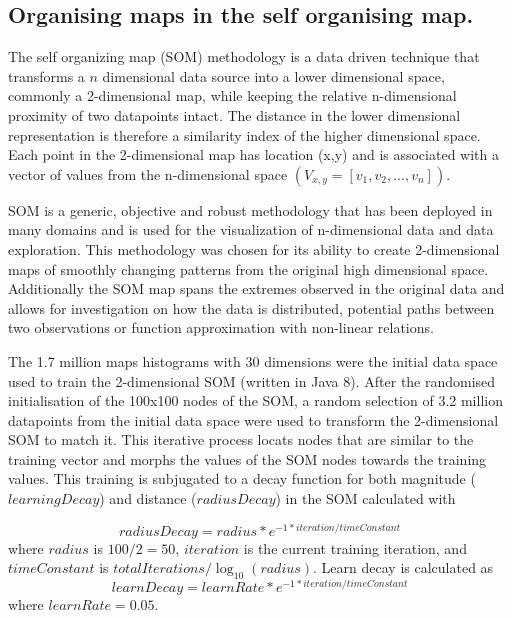 \documentclass{nature}
\begin{document}
\begin{methods}
\subsection{Organising maps in the self organising map.}\label{methodscluster}
The self organizing map (SOM) methodology\cite{Kohonen1982} is a data driven technique that transforms a $n$ dimensional data source into a lower dimensional space, commonly a 2-dimensional map, while keeping the relative n-dimensional proximity of two datapoints intact. The distance in the lower dimensional representation is therefore a similarity index of the higher dimensional space. Each point in the 2-dimensional map has location (x,y) and is associated with a vector of values from the n-dimensional space $(V_{x,y} = [v_{1},v_{2},...,v_{n}])$.

SOM is a generic, objective and robust methodology that has been deployed in many domains and is used for the visualization of n-dimensional data and data exploration\cite{Koleheimen2004}. This methodology was chosen for its ability to create 2-dimensional maps of smoothly changing patterns from the original high dimensional space. Additionally the SOM map spans the extremes observed in the original data and allows for investigation on how the data is distributed, potential paths between two observations or function approximation with non-linear relations\cite{Barreto2006}. 

The 1.7 million maps histograms with 30 dimensions were the initial data space used to train the 2-dimensional SOM (written in Java 8\cite{Oracle2018}). After the randomised initialisation of the 100x100 nodes of the SOM, a random selection of 3.2 million datapoints from the initial data space were used to transform the 2-dimensional SOM to match it. This iterative process locats nodes that are similar to the training vector and morphs the values of the SOM nodes towards the training values. This training is subjugated to a decay function for both magnitude ($learningDecay$) and  distance ($radiusDecay$) in the SOM calculated with


\begin{equation} 
radiusDecay = radius * e^{-1 * iteration / timeConstant}
\end{equation}
where $radius$ is $100/2=50$, $iteration$ is the current training iteration, and $timeConstant$ is $totalIterations / \log _{10} (radius)$. Learn decay is calculated as
\begin{equation} 
learnDecay = learnRate * e^{-1 * iteration / timeConstant}
\end{equation}
where $learnRate = 0.05$.


\end{methods}
\end{document}
